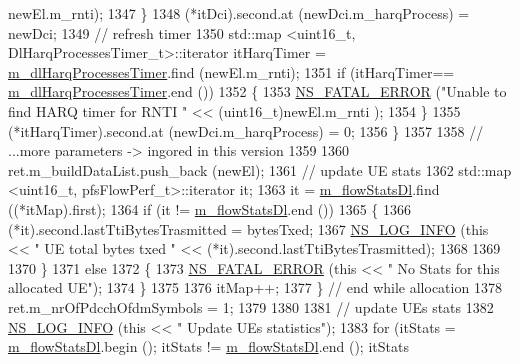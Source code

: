 \begin{DoxyCode}
      newEl.m\_rnti);
1347             \}
1348           (*itDci).second.at (newDci.m\_harqProcess) = newDci;
1349           \textcolor{comment}{// refresh timer}
1350           std::map <uint16\_t, DlHarqProcessesTimer\_t>::iterator itHarqTimer =  
      \hyperlink{classns3_1_1PfFfMacScheduler_ab115ef9abb936f35aeb5979a8ed8928d}{m\_dlHarqProcessesTimer}.find (newEl.m\_rnti);
1351           \textcolor{keywordflow}{if} (itHarqTimer== \hyperlink{classns3_1_1PfFfMacScheduler_ab115ef9abb936f35aeb5979a8ed8928d}{m\_dlHarqProcessesTimer}.end ())
1352             \{
1353               \hyperlink{group__fatal_ga5131d5e3f75d7d4cbfd706ac456fdc85}{NS\_FATAL\_ERROR} (\textcolor{stringliteral}{"Unable to find HARQ timer for RNTI "} << (uint16\_t)newEl.m\_rnti
      );
1354             \}
1355           (*itHarqTimer).second.at (newDci.m\_harqProcess) = 0;
1356         \}
1357 
1358       \textcolor{comment}{// ...more parameters -> ingored in this version}
1359 
1360       ret.m\_buildDataList.push\_back (newEl);
1361       \textcolor{comment}{// update UE stats}
1362       std::map <uint16\_t, pfsFlowPerf\_t>::iterator it;
1363       it = \hyperlink{classns3_1_1PfFfMacScheduler_a00b148349167b85ab9170570e2530b92}{m\_flowStatsDl}.find ((*itMap).first);
1364       \textcolor{keywordflow}{if} (it != \hyperlink{classns3_1_1PfFfMacScheduler_a00b148349167b85ab9170570e2530b92}{m\_flowStatsDl}.end ())
1365         \{
1366           (*it).second.lastTtiBytesTrasmitted = bytesTxed;
1367           \hyperlink{group__logging_gafbd73ee2cf9f26b319f49086d8e860fb}{NS\_LOG\_INFO} (\textcolor{keyword}{this} << \textcolor{stringliteral}{" UE total bytes txed "} << (*it).second.lastTtiBytesTrasmitted);
1368 
1369 
1370         \}
1371       \textcolor{keywordflow}{else}
1372         \{
1373           \hyperlink{group__fatal_ga5131d5e3f75d7d4cbfd706ac456fdc85}{NS\_FATAL\_ERROR} (\textcolor{keyword}{this} << \textcolor{stringliteral}{" No Stats for this allocated UE"});
1374         \}
1375 
1376       itMap++;
1377     \} \textcolor{comment}{// end while allocation}
1378   ret.m\_nrOfPdcchOfdmSymbols = 1;   
1379 
1380 
1381   \textcolor{comment}{// update UEs stats}
1382   \hyperlink{group__logging_gafbd73ee2cf9f26b319f49086d8e860fb}{NS\_LOG\_INFO} (\textcolor{keyword}{this} << \textcolor{stringliteral}{" Update UEs statistics"});
1383   \textcolor{keywordflow}{for} (itStats = \hyperlink{classns3_1_1PfFfMacScheduler_a00b148349167b85ab9170570e2530b92}{m\_flowStatsDl}.begin (); itStats != \hyperlink{classns3_1_1PfFfMacScheduler_a00b148349167b85ab9170570e2530b92}{m\_flowStatsDl}.end (); itStats

\end{DoxyCode}
